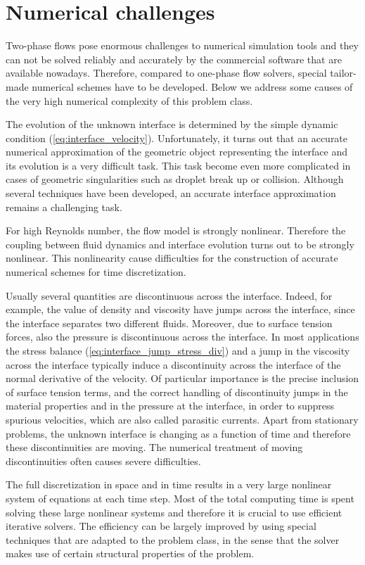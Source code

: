\section{Numerical challenges}\label{sec:numerical_challenges}
Two-phase flows pose enormous challenges to numerical simulation tools and
they can not be solved reliably and accurately by the commercial software that
are available nowadays. Therefore, compared to one-phase flow solvers, special
tailor-made numerical schemes have to be developed. Below we address some causes
of the very high numerical complexity of this problem class.

The evolution of the unknown interface is determined by the simple dynamic
condition (\ref{eq:interface_velocity}). Unfortunately, it turns out that an
accurate numerical approximation of the geometric object representing the
interface and its evolution is a very difficult task. This task become even
more complicated in cases of geometric singularities such as droplet break up or
collision. Although several techniques have been developed, an accurate
interface approximation remains a challenging task.

For high Reynolds number, the flow model is strongly nonlinear. Therefore the
coupling between fluid dynamics and interface evolution turns out to be strongly
nonlinear. This nonlinearity cause difficulties for the construction of
accurate numerical schemes for time discretization.

Usually several quantities are discontinuous across the interface. Indeed, for
example, the value of density and viscosity have jumps across the interface,
since the interface separates two different fluids. Moreover, due to surface
tension forces, also the pressure is discontinuous across the interface. In
most applications the stress balance (\ref{eq:interface_jump_stress_div}) and a
jump in the viscosity across the interface typically induce a discontinuity
across the interface of the normal derivative of the velocity. Of particular
importance is the precise inclusion of surface tension terms, and the correct
handling of discontinuity jumps in the material properties and in the pressure
at the interface, in order to suppress spurious velocities, which are also
called parasitic currents. Apart from stationary problems, the unknown
interface is changing as a function of time and therefore these discontinuities
are moving. The numerical treatment of moving discontinuities often causes
severe difficulties.

The full discretization in space and in time results in a very large nonlinear
system of equations at each time step. Most of the total computing time is
spent solving these large nonlinear systems and therefore it is crucial to use
efficient iterative solvers. The efficiency can be largely improved by using
special techniques that are adapted to the problem class, in the sense that the
solver makes use of certain structural properties of the problem.

